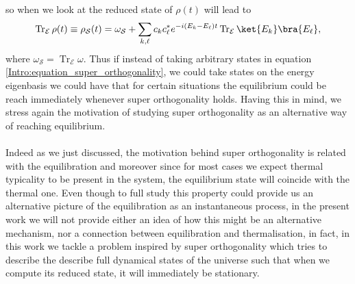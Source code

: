 so when we look at the reduced state of $\rho(t)$ will lead to
\begin{equation}
\operatorname{Tr}_{\mathcal{E}} \rho(t) \equiv \rho_{\mathcal{S}}(t) =\omega_{\mathcal{S}} + \sum_{ k,\ell}c_kc^*_\ell e^{-i(E_k-E_\ell)t}\operatorname{Tr}_{\mathcal{E}}\ket{E_k}\bra{E_\ell},
\end{equation}
where $\omega_{\mathcal{S}} = \operatorname{Tr}_{\mathcal{E}} \omega$. Thus if instead of taking arbitrary states in equation \eqref{Intro:equation_super_orthogonality}, we could take states on the energy eigenbasis we could have that for certain situations the equilibrium could be reach immediately whenever super orthogonality holds. Having this in mind, we stress again the motivation of studying super orthogonality as an alternative way of reaching equilibrium.\\\\
\indent Indeed as we just discussed, the motivation behind super orthogonality is related with the equilibration and moreover since for most cases we expect thermal typicality to be present in the system, the equilibrium state will coincide with the thermal one. Even though to full study this property could provide us an alternative picture of the equilibration as an instantaneous process, in the present work we will not provide either an idea of how this might be an alternative mechanism,  nor a connection between equilibration and thermalisation, in fact, in this work we tackle a problem inspired by super orthogonality which tries to describe the describe full dynamical states of the universe such that when we compute its reduced state, it will immediately be stationary.



